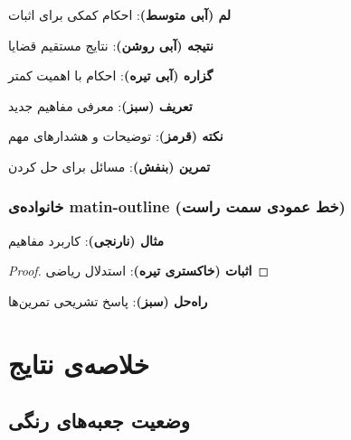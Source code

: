 \documentclass{matinbook}
\begin{document}
\begin{lemma}
    \textbf{لم (آبی متوسط)}: احکام کمکی برای اثبات
\end{lemma}

\begin{corollary}
    \textbf{نتیجه (آبی روشن)}: نتایج مستقیم قضایا
\end{corollary}

\begin{proposition}
    \textbf{گزاره (آبی تیره)}: احکام با اهمیت کمتر
\end{proposition}

\begin{definition}
    \textbf{تعریف (سبز)}: معرفی مفاهیم جدید
\end{definition}

\begin{remark}
    \textbf{نکته (قرمز)}: توضیحات و هشدارهای مهم
\end{remark}

\begin{exercise}
    \textbf{تمرین (بنفش)}: مسائل برای حل کردن
\end{exercise}

\subsection*{خانواده‌ی matin-outline (خط عمودی سمت راست)}

\begin{example}
    \textbf{مثال (نارنجی)}: کاربرد مفاهیم
\end{example}

\begin{proof}
    \textbf{اثبات (خاکستری تیره)}: استدلال ریاضی
\end{proof}

\begin{solution}
    \textbf{راه‌حل (سبز)}: پاسخ تشریحی تمرین‌ها
\end{solution}

\chapter{خلاصه‌ی نتایج}
\label{chap:summary}

\section{وضعیت جعبه‌های رنگی}
\label{sec:summary-status}
\end{document}
